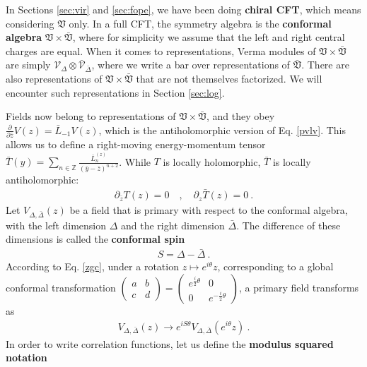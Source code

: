 \documentclass[12pt, a4paper]{article}
\theoremstyle{break}
\begin{document}
In Sections \ref{sec:vir} and \ref{sec:fope}, we have been doing \textbf{chiral CFT}, which means considering $\mathfrak{V}$ only. In a full CFT, the symmetry algebra is the \textbf{conformal algebra} $\mathfrak{V}\times \bar{\mathfrak{V}}$, where for simplicity we assume that the left and right central charges are equal. When it comes to representations, Verma modules of $\mathfrak{V}\times \bar{\mathfrak{V}}$ are simply $\mathcal{V}_\Delta\otimes \bar{\mathcal{V}}_{\bar \Delta}$, where we write a bar over representations of $\bar{\mathfrak{V}}$. There are also representations of $\mathfrak{V}\times \bar{\mathfrak{V}}$ that are not themselves factorized. We will encounter such representations in Section \ref{sec:log}. 

Fields now belong to representations of $\mathfrak{V}\times \bar{\mathfrak{V}}$, and they obey $\frac{\partial}{\partial \bar z} V(z) = \bar L_{-1} V(z)$, which is the antiholomorphic version of Eq. \eqref{pvlv}. This allows us to define a right-moving energy-momentum tensor $\bar T(y) = \sum_{n\in\mathbb{Z}} \frac{\bar L_n^{(z)}}{(\bar y-\bar z)^{n+2}}$. While $T$ is locally holomorphic, $\bar T$ is locally antiholomorphic:
\begin{align}
 \partial_{\bar z} T(z) = 0 \quad , \quad \partial_z \bar T(z) = 0 \ . 
\end{align}
Let $V_{\Delta,\bar\Delta}(z)$ be a field that is primary with respect to the conformal algebra, with the left dimension $\Delta$ and the right dimension $\bar\Delta$. The difference of these dimensions is called the \textbf{conformal spin}
\begin{align}
 S = \Delta -\bar\Delta\ . 
 \label{sdd} 
\end{align}
According to Eq. \eqref{zgc}, 
under a rotation $z\mapsto e^{i\theta}z$, corresponding to a global conformal transformation $\left(\begin{smallmatrix} a & b \\ c & d\end{smallmatrix}\right)= \left(\begin{smallmatrix} e^{\frac{i}{2}\theta} & 0 \\ 0 &  e^{-\frac{i}{2}\theta}\end{smallmatrix}\right)$, a primary field transforms as 
\begin{align}
 V_{\Delta,\bar\Delta}(z) \to  e^{iS\theta} V_{\Delta,\bar\Delta}\left(e^{i\theta} z\right) \ .
 \label{veis}
\end{align}
In order to write correlation functions, let us define the \textbf{modulus squared notation} 
\end{document}
